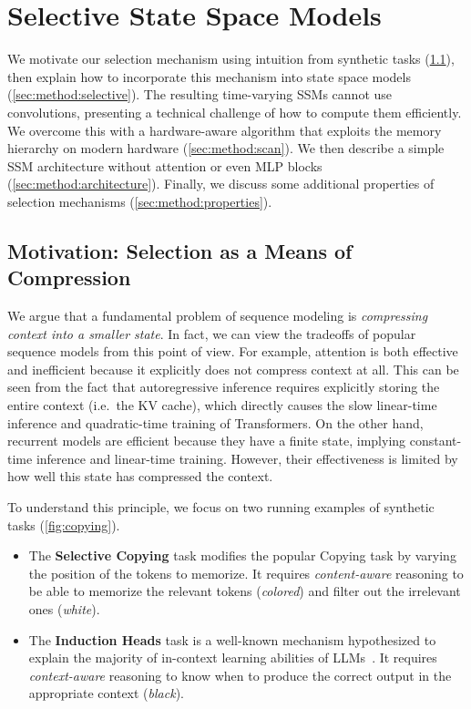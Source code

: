 

\section{Selective State Space Models}
\label{sec:method}

We motivate our selection mechanism using intuition from synthetic tasks (\cref{sec:method:motivation}), then explain how to incorporate this mechanism into state space models (\cref{sec:method:selective}).
The resulting time-varying SSMs cannot use convolutions, presenting a technical challenge of how to compute them efficiently.
We overcome this with a hardware-aware algorithm that exploits the memory hierarchy on modern hardware (\cref{sec:method:scan}).
We then describe a simple SSM architecture without attention or even MLP blocks (\cref{sec:method:architecture}).
Finally, we discuss some additional properties of selection mechanisms (\cref{sec:method:properties}).

\subsection{Motivation: Selection as a Means of Compression}
\label{sec:method:motivation}

We argue that a fundamental problem of sequence modeling is \emph{compressing context into a smaller state}.
In fact, we can view the tradeoffs of popular sequence models from this point of view.
For example, attention is both effective and inefficient because it explicitly does not compress context at all.
This can be seen from the fact that autoregressive inference requires explicitly storing the entire context (i.e.\ the KV cache), which directly causes the slow linear-time inference and quadratic-time training of Transformers.
On the other hand, recurrent models are efficient because they have a finite state, implying constant-time inference and linear-time training.
However, their effectiveness is limited by how well this state has compressed the context.

To understand this principle,
we focus on two running examples of synthetic tasks (\cref{fig:copying}).
\begin{itemize}[leftmargin=*,itemsep=0pt,topsep=0pt]
  \item The \textbf{Selective Copying} task modifies the popular Copying task \citep{arjovsky2016unitary} by varying the position of the tokens to memorize. It requires \emph{content-aware} reasoning to be able to memorize the relevant tokens (\emph{colored}) and filter out the irrelevant ones (\emph{white}).
  \item The \textbf{Induction Heads} task is a well-known mechanism hypothesized to explain the majority of in-context learning abilities of LLMs~\citep{olsson2022context}. It requires \emph{context-aware} reasoning to know when to produce the correct output in the appropriate context (\emph{black}).
\end{itemize}

